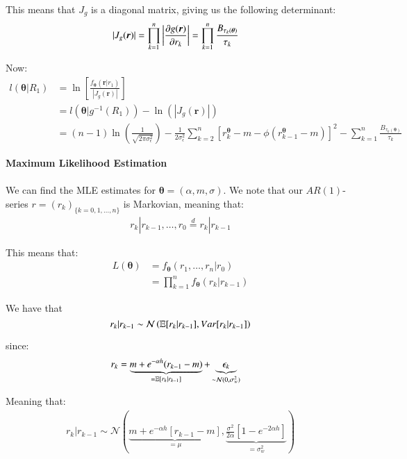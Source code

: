 This means that $J_{g}$ is a diagonal matrix, giving us the following determinant: 
\begin{align*}
|J_{g}(\bm{r})| 
&= 
\prod_{k=1}^{n}
\bigg{|}
\frac{\partial g(\bm{r})}{\partial r_{k}}
\bigg{|}
= 
\prod_{k=1}^{n}\frac{B_{\tau_{k}(\bm{\theta})}}{\tau_{k}}
\end{align*}

Now: 
\begin{align*}
l(\bm{\theta}|R_{1}) &= 
\ln\left[
\frac{
 f_{\bm{\theta}}(\bm{r}|r_{1})
 }{
 |J_{g}(\bm{r})|
 }  
\right] \\
&= 
l(\bm{\theta}|g^{-1}(R_{1})) - \ln(|J_{g}(\bm{r})|) \\ 
&= 
(n-1)\ln\left(
\frac{1}{
\sqrt{2\pi \sigma_{\epsilon}^{2}}
}
\right)
- \frac{1}{2\sigma_{\epsilon}^{2}}
\sum_{k=2}^{n}\left[
r_{k}^{\bm{\theta}} - m - \phi(r_{k-1}^{\bm{\theta}} -m)
\right]^{2}
- \sum_{k=1}^{n}\frac{B_{\tau_{k}(\bm{\theta})}}{\tau_{k}}
\end{align*}









\newpage 
\textbf{Maximum Likelihood Estimation}
\\~\\ 
We can find the MLE   estimates for $\bm{\theta} = (\alpha, m, \sigma)$. We note that our $AR(1)$-series $r = (r_{k})_{\{k = 0, 1, \dots, n\}}$ is Markovian, meaning that: 
\begin{align*}
r_{k}|r_{k-1}, \dots, r_{0} \stackrel{d}{=} r_{k}|r_{k-1}    
\end{align*}

This means that: 
\begin{align*}
L(\bm{\theta}) &= f_{\bm{\theta}}(r_{1}, \dots, r_{n}|r_{0}) \\ 
&= \prod_{k=1}^{n}f_{\bm{\theta}}(r_{k}|r_{k-1})
\end{align*}

We have that 
\[
r_{k}|r_{k-1} \sim \mathcal{N}\left(
\mathbb{E}[r_{k}|r_{k-1}], Var[r_{k}|r_{k-1}]
\right)
\]

since: 
\begin{align*}
r_{k} &= \underbrace{m + e^{-\alpha h}(r_{k-1}-m)}_{= \mathbb{E}[r_{k}|r_{k-1}]} 
+ \underbrace{\epsilon_{k}}_{\sim \mathcal{N}(0, \sigma_{w}^{2})}    
\end{align*}

Meaning that: 
\begin{align*}
r_{k}|r_{k-1} \sim \mathcal{N}\left(
\underbrace{
m + e^{-\alpha h}[r_{k-1}-m]
}_{= \mu}, 
\underbrace{
\frac{\sigma^{2}}{2\alpha}\left[1-e^{-2\alpha h}\right]
}_{= \sigma_{w}^{2}}
\right)    
\end{align*}

